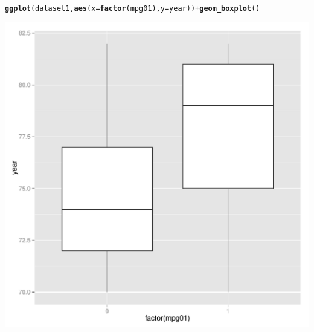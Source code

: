 \documentclass{article}\usepackage[]{graphicx}\usepackage[]{color}
\makeatletter
\def\maxwidth{ %
  \ifdim\Gin@nat@width>\linewidth
    \linewidth
  \else
    \Gin@nat@width
  \fi
}
\newcommand{\hlopt}[1]{\textcolor[rgb]{0,0,0}{#1}}%
\newcommand{\hlstd}[1]{\textcolor[rgb]{0.345,0.345,0.345}{#1}}%
\newcommand{\hlkwc}[1]{\textcolor[rgb]{0.333,0.667,0.333}{#1}}%
\newcommand{\hlkwd}[1]{\textcolor[rgb]{0.737,0.353,0.396}{\textbf{#1}}}%
\newenvironment{kframe}{%
 \def\at@end@of@kframe{}%
 \ifinner\ifhmode%
  \def\at@end@of@kframe{\end{minipage}}%
  \begin{minipage}{\columnwidth}%
 \fi\fi%
 \def\FrameCommand##1{\hskip\@totalleftmargin \hskip-\fboxsep
 \colorbox{shadecolor}{##1}\hskip-\fboxsep
     \hskip-\linewidth \hskip-\@totalleftmargin \hskip\columnwidth}%
 \MakeFramed {\advance\hsize-\width
   \@totalleftmargin\z@ \linewidth\hsize
   \@setminipage}}%
 {\par\unskip\endMakeFramed%
 \at@end@of@kframe}
\newenvironment{knitrout}{}{} %
\makeatother
\begin{document}
\begin{enumerate}[(a)]
\begin{knitrout}
\begin{kframe}\begin{alltt}
\hlkwd{ggplot}\hlstd{(dataset1,} \hlkwd{aes}\hlstd{(}\hlkwc{x}\hlstd{=}\hlkwd{factor}\hlstd{(mpg01),} \hlkwc{y}\hlstd{=year))}\hlopt{+}\hlkwd{geom_boxplot}\hlstd{()}
\end{alltt}
\end{kframe}
\includegraphics[width=\maxwidth]{figure/unnamed-chunk-7-7} 

\end{knitrout}


\end{enumerate}
\end{document}
